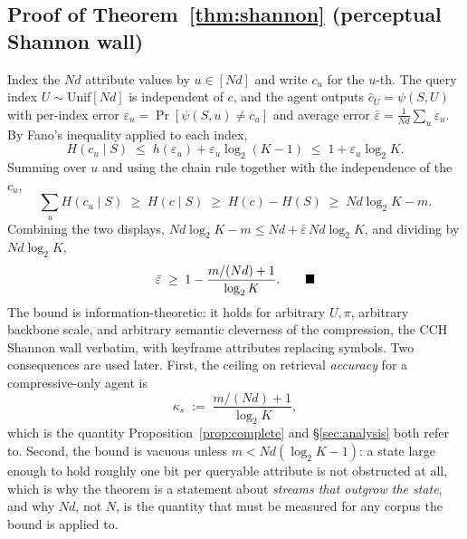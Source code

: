 \documentclass[10pt]{article}
\theoremstyle{definition}
\theoremstyle{plain}
\newcommand{\qedmark}{\ensuremath{\blacksquare}}
\newcommand{\proofenddisp}{\tag*{\qedmark}}
\begin{document}
\subsection{Proof of Theorem~\ref{thm:shannon} (perceptual Shannon wall)}
\label{app:shannon}
Index the $Nd$ attribute values by $u\in[Nd]$ and write $c_u$ for the $u$-th. The query index $U\sim\mathrm{Unif}[Nd]$ is independent of $c$, and the agent outputs $\hat c_U=\psi(S,U)$ with per-index error $\varepsilon_u=\Pr[\psi(S,u)\neq c_u]$ and average error $\bar\varepsilon=\frac1{Nd}\sum_u\varepsilon_u$. By Fano's inequality applied to each index,
\[
H(c_u\mid S)\;\le\;h(\varepsilon_u)+\varepsilon_u\log_2(K-1)\;\le\;1+\varepsilon_u\log_2 K .
\]
Summing over $u$ and using the chain rule together with the independence of the $c_u$,
\[
\sum_{u}H(c_u\mid S)\;\ge\;H(c\mid S)\;\ge\;H(c)-H(S)\;\ge\;Nd\log_2K-m .
\]
Combining the two displays, $Nd\log_2K-m\le Nd+\bar\varepsilon\,Nd\log_2K$, and dividing by $Nd\log_2K$,
\begin{equation*}
\bar\varepsilon\;\ge\;1-\frac{m/(Nd)+1}{\log_2 K}. \proofenddisp
\end{equation*}
The bound is information-theoretic: it holds for arbitrary $U,\pi$, arbitrary backbone scale, and arbitrary semantic cleverness of the compression, the CCH Shannon wall verbatim, with keyframe attributes replacing symbols. Two consequences are used later. First, the ceiling on retrieval \emph{accuracy} for a compressive-only agent is
\begin{equation}
\label{eq:kappa}
\kappa_s\;:=\;\frac{m/(Nd)+1}{\log_2 K},
\end{equation}
which is the quantity Proposition~\ref{prop:complete} and \S\ref{sec:analysis} both refer to. Second, the bound is vacuous unless $m<Nd(\log_2K-1)$: a state large enough to hold roughly one bit per queryable attribute is not obstructed at all, which is why the theorem is a statement about \emph{streams that outgrow the state}, and why $Nd$, not $N$, is the quantity that must be measured for any corpus the bound is applied to.
\end{document}
